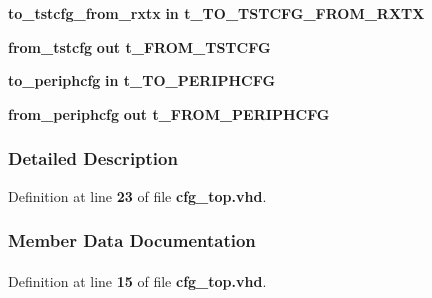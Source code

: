 \begin{DoxyCompactItemize}
\item 
{\bf to\+\_\+tstcfg\+\_\+from\+\_\+rxtx}  {\bfseries {\bfseries \textcolor{keywordflow}{in}\textcolor{vhdlchar}{ }}} {\bfseries {\bfseries {\bf t\+\_\+\+T\+O\+\_\+\+T\+S\+T\+C\+F\+G\+\_\+\+F\+R\+O\+M\+\_\+\+R\+X\+TX}} \textcolor{vhdlchar}{ }} 
\item 
{\bf from\+\_\+tstcfg}  {\bfseries {\bfseries \textcolor{keywordflow}{out}\textcolor{vhdlchar}{ }}} {\bfseries {\bfseries {\bf t\+\_\+\+F\+R\+O\+M\+\_\+\+T\+S\+T\+C\+FG}} \textcolor{vhdlchar}{ }} 
\item 
{\bf to\+\_\+periphcfg}  {\bfseries {\bfseries \textcolor{keywordflow}{in}\textcolor{vhdlchar}{ }}} {\bfseries {\bfseries {\bf t\+\_\+\+T\+O\+\_\+\+P\+E\+R\+I\+P\+H\+C\+FG}} \textcolor{vhdlchar}{ }} 
\item 
{\bf from\+\_\+periphcfg}  {\bfseries {\bfseries \textcolor{keywordflow}{out}\textcolor{vhdlchar}{ }}} {\bfseries {\bfseries {\bf t\+\_\+\+F\+R\+O\+M\+\_\+\+P\+E\+R\+I\+P\+H\+C\+FG}} \textcolor{vhdlchar}{ }} 
\end{DoxyCompactItemize}


\subsubsection{Detailed Description}


Definition at line {\bf 23} of file {\bf cfg\+\_\+top.\+vhd}.



\subsubsection{Member Data Documentation}
\paragraph[{fpgacfg\+\_\+pkg}]{\hspace{0.3cm}{\ttfamily [Package]}}\label{classcfg__top_a7940d44b44e7f5768ec664c22b88f3aa}


Definition at line {\bf 15} of file {\bf cfg\+\_\+top.\+vhd}.

